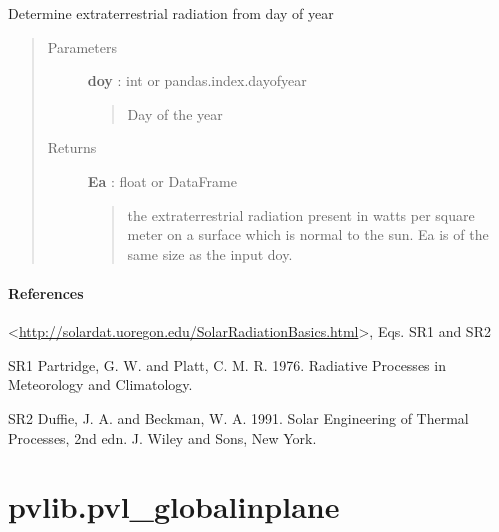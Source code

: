 \documentclass[letterpaper,10pt,english]{sphinxmanual}
\begin{document}
\begin{fulllineitems}
\label{stubs/pvlib.pvl_extraradiation:pvlib.pvl_extraradiation}
Determine extraterrestrial radiation from day of year
\begin{quote}\begin{description}
\item[{Parameters}] \leavevmode
\textbf{doy} : int or pandas.index.dayofyear
\begin{quote}

Day of the year
\end{quote}

\item[{Returns}] \leavevmode
\textbf{Ea} : float or DataFrame
\begin{quote}

the extraterrestrial radiation present in watts per square meter
on a surface which is normal to the sun. Ea is of the same size as the
input doy.
\end{quote}

\end{description}\end{quote}




{\hyperref[stubs/pvlib.pvl_disc:pvlib.pvl_disc]{}}


\paragraph{References}

\textless{}\href{http://solardat.uoregon.edu/SolarRadiationBasics.html}{http://solardat.uoregon.edu/SolarRadiationBasics.html}\textgreater{}, Eqs. SR1 and SR2

SR1       Partridge, G. W. and Platt, C. M. R. 1976. Radiative Processes in Meteorology and Climatology.

SR2       Duffie, J. A. and Beckman, W. A. 1991. Solar Engineering of Thermal Processes, 2nd edn. J. Wiley and Sons, New York.

\end{fulllineitems}



\section{pvlib.pvl\_globalinplane}
\label{stubs/pvlib.pvl_globalinplane:pvlib-pvl-globalinplane}\label{stubs/pvlib.pvl_globalinplane::doc}
\end{document}
